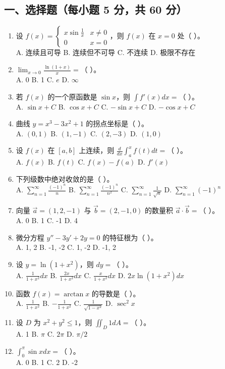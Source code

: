 \documentclass[11pt,a4paper]{article}
\begin{document}
\subsection*{一、选择题（每小题 5 分，共 60 分）}
\begin{enumerate}
    \item 设 $f(x) = \begin{cases} x \sin \frac{1}{x} & x \neq 0 \\ 0 & x = 0 \end{cases}$，则 $f(x)$ 在 $x=0$ 处（ ）。 \\
    A. 连续且可导 \quad B. 连续但不可导 \quad C. 不连续 \quad D. 极限不存在
    \item $\lim_{x \to 0} \frac{\ln(1+x)}{x} = $（ ）。 \\
    A. 0 \quad B. 1 \quad C. $e$ \quad D. $\infty$
    \item 若 $f(x)$ 的一个原函数是 $\sin x$，则 $\int f'(x) dx = $（ ）。 \\
    A. $\sin x + C$ \quad B. $\cos x + C$ \quad C. $-\sin x + C$ \quad D. $-\cos x + C$
    \item 曲线 $y = x^3 - 3x^2 + 1$ 的拐点坐标是（ ）。 \\
    A. $(0, 1)$ \quad B. $(1, -1)$ \quad C. $(2, -3)$ \quad D. $(1, 0)$
    \item 设 $f(x)$ 在 $[a, b]$ 上连续，则 $\frac{d}{dx} \int_{a}^{x} f(t) dt = $（ ）。 \\
    A. $f(x)$ \quad B. $f(t)$ \quad C. $f(x) - f(a)$ \quad D. $f'(x)$
    \item 下列级数中绝对收敛的是（ ）。 \\
    A. $\sum_{n=1}^{\infty} \frac{(-1)^n}{n}$ \quad B. $\sum_{n=1}^{\infty} \frac{(-1)^n}{n^2}$ \quad C. $\sum_{n=1}^{\infty} \frac{1}{\sqrt{n}}$ \quad D. $\sum_{n=1}^{\infty} (-1)^n$
    \item 向量 $\vec{a} = (1, 2, -1)$ 与 $\vec{b} = (2, -1, 0)$ 的数量积 $\vec{a} \cdot \vec{b} = $（ ）。 \\
    A. 0 \quad B. 1 \quad C. -1 \quad D. 4
    \item 微分方程 $y'' - 3y' + 2y = 0$ 的特征根为（ ）。 \\
    A. 1, 2 \quad B. -1, -2 \quad C. 1, -2 \quad D. -1, 2
    \item 设 $y = \ln(1+x^2)$，则 $dy = $（ ）。 \\
    A. $\frac{1}{1+x^2} dx$ \quad B. $\frac{2x}{1+x^2} dx$ \quad C. $\frac{x}{1+x^2} dx$ \quad D. $2x \ln(1+x^2) dx$
    \item 函数 $f(x) = \arctan x$ 的导数是（ ）。 \\
    A. $\frac{1}{1+x^2}$ \quad B. $-\frac{1}{1+x^2}$ \quad C. $\frac{1}{\sqrt{1-x^2}}$ \quad D. $\sec^2 x$
    \item 设 $D$ 为 $x^2 + y^2 \le 1$，则 $\iint_D 1 dA = $（ ）。 \\
    A. 1 \quad B. $\pi$ \quad C. $2\pi$ \quad D. $\pi/2$
    \item $\int_{0}^{\pi} \sin x dx = $（ ）。 \\
    A. 0 \quad B. 1 \quad C. 2 \quad D. -2
\end{enumerate}
\end{document}
